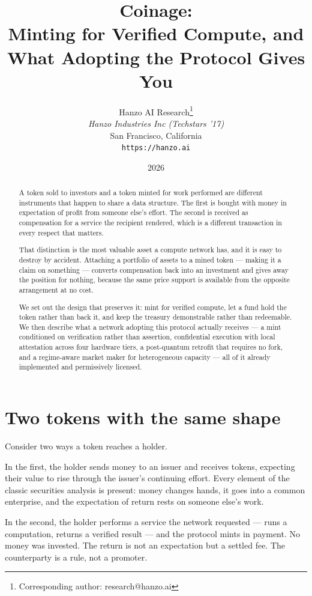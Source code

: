 \documentclass[11pt,a4paper]{article}
\title{Coinage:\\Minting for Verified Compute, and What Adopting the Protocol Gives You}
\author{
Hanzo AI Research\thanks{Corresponding author: research@hanzo.ai} \\
\textit{Hanzo Industries Inc (Techstars '17)} \\
San Francisco, California \\
\texttt{https://hanzo.ai}
}
\date{2026}
\begin{document}
\hanzocoverpage

\begin{abstract}
A token sold to investors and a token minted for work performed are different
instruments that happen to share a data structure. The first is bought with
money in expectation of profit from someone else's effort. The second is
received as compensation for a service the recipient rendered, which is a
different transaction in every respect that matters.

That distinction is the most valuable asset a compute network has, and it is
easy to destroy by accident. Attaching a portfolio of assets to a mined token
--- making it a claim on something --- converts compensation back into an
investment and gives away the position for nothing, because the same price
support is available from the opposite arrangement at no cost.

We set out the design that preserves it: mint for verified compute, let a fund
hold the token rather than back it, and keep the treasury demonstrable rather
than redeemable. We then describe what a network adopting this protocol
actually receives --- a mint conditioned on verification rather than assertion,
confidential execution with local attestation across four hardware tiers, a
post-quantum retrofit that requires no fork, and a regime-aware market maker for
heterogeneous capacity --- all of it already implemented and permissively
licensed.
\end{abstract}

\tableofcontents
\newpage

\section{Two tokens with the same shape}

Consider two ways a token reaches a holder.

In the first, the holder sends money to an issuer and receives tokens, expecting
their value to rise through the issuer's continuing effort. Every element of the
classic securities analysis is present: money changes hands, it goes into a
common enterprise, and the expectation of return rests on someone else's work.

In the second, the holder performs a service the network requested --- runs a
computation, returns a verified result --- and the protocol mints in payment. No
money was invested. The return is not an expectation but a settled fee. The
counterparty is a rule, not a promoter.
\end{document}
